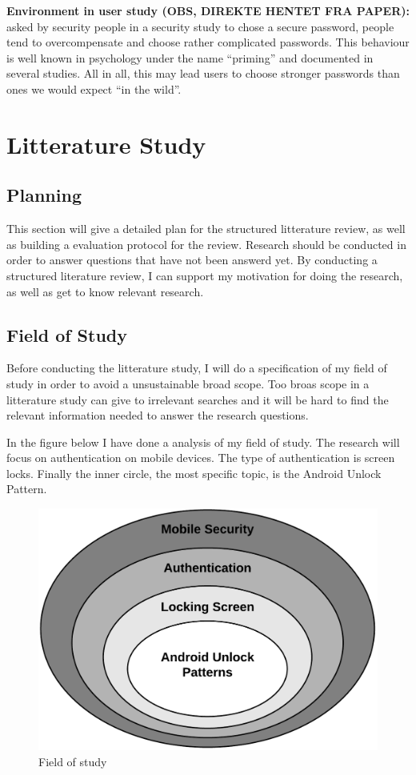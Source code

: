   {\bf Environment in user study (OBS, DIREKTE HENTET FRA PAPER):} asked by security people in a security study to chose a secure password, people tend to overcompensate and choose rather complicated passwords. This behaviour is well known in psychology under the name ``priming'' and documented in several studies. All in all, this may lead users to choose stronger passwords than ones we would expect ``in the wild''.



\chapter{Litterature Study}
  \section{Planning}
    This section will give a detailed plan for the structured litterature review, as well as building a 
    evaluation protocol for the review. 
    Research should be conducted in order to answer questions that have not been answerd yet. 
    By conducting a structured literature review, I can support my motivation for doing the research, 
    as well as get to know relevant research. 

    \section{Field of Study}
    Before conducting the litterature study, I will do a specification of my field of study in order to
    avoid a unsustainable broad scope. Too broas scope in a litterature study can give to irrelevant searches 
    and it will be hard to find the relevant information needed to answer the research questions. 

    In the figure below I have done a analysis of my field of study. The research will focus on authentication on mobile devices. 
    The type of authentication is screen locks. Finally the inner circle, the most specific topic, is the Android Unlock Pattern. 

    \begin{figure}[H]
    \centering
    \includegraphics[scale=0.25]{pics/Fieldofstudy.png}
    \caption{Field of study}
    \end{figure}

